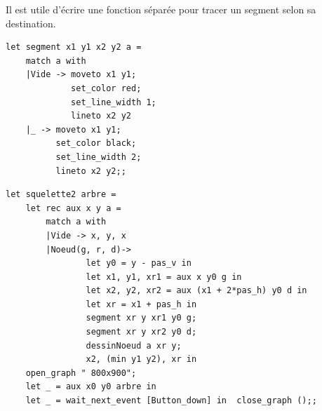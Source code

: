 \begin{Answer}
Il est utile d'écrire une fonction séparée pour tracer un segment selon sa destination.


\begin{lstlisting}
let segment x1 y1 x2 y2 a =
    match a with
    |Vide -> moveto x1 y1;
             set_color red;
             set_line_width 1;
             lineto x2 y2
    |_ -> moveto x1 y1;
          set_color black;
          set_line_width 2;
          lineto x2 y2;;
\end{lstlisting}

\begin{lstlisting}
let squelette2 arbre =
    let rec aux x y a =
        match a with
        |Vide -> x, y, x
        |Noeud(g, r, d)-> 
                let y0 = y - pas_v in
                let x1, y1, xr1 = aux x y0 g in
                let x2, y2, xr2 = aux (x1 + 2*pas_h) y0 d in
                let xr = x1 + pas_h in
                segment xr y xr1 y0 g;
                segment xr y xr2 y0 d;
                dessinNoeud a xr y;
                x2, (min y1 y2), xr in
    open_graph " 800x900";
    let _ = aux x0 y0 arbre in
    let _ = wait_next_event [Button_down] in  close_graph ();;
\end{lstlisting}

\newpage

\end{Answer}
\newpage
